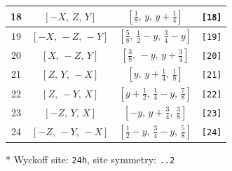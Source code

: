\documentclass[fleqn,8pt]{jsarticle}
\begin{document}
\begin{longtable}{cccc}
18 & $\left[ - X,\, Z,\, Y \right]$ & $\left[ \frac{1}{8},\, y,\, y + \frac{1}{4} \right]$ & {\tt [18]} \\ \hline
19 & $\left[ - X,\, - Z,\, - Y \right]$ & $\left[ \frac{5}{8},\, \frac{1}{2} - y,\, \frac{3}{4} - y \right]$ & {\tt [19]} \\ \hline
20 & $\left[ X,\, - Z,\, Y \right]$ & $\left[ \frac{3}{8},\, - y,\, y + \frac{3}{4} \right]$ & {\tt [20]} \\ \hline
21 & $\left[ Z,\, Y,\, - X \right]$ & $\left[ y,\, y + \frac{1}{4},\, \frac{1}{8} \right]$ & {\tt [21]} \\ \hline
22 & $\left[ Z,\, - Y,\, X \right]$ & $\left[ y + \frac{1}{2},\, \frac{1}{4} - y,\, \frac{7}{8} \right]$ & {\tt [22]} \\ \hline
23 & $\left[ - Z,\, Y,\, X \right]$ & $\left[ - y,\, y + \frac{3}{4},\, \frac{3}{8} \right]$ & {\tt [23]} \\ \hline
24 & $\left[ - Z,\, - Y,\, - X \right]$ & $\left[ \frac{1}{2} - y,\, \frac{3}{4} - y,\, \frac{5}{8} \right]$ & {\tt [24]} \\
\end{longtable}
* Wyckoff site: {\tt 24h}, site symmetry: {\tt ..2}
\renewcommand{\arraystretch}{1.2}
\end{document}
